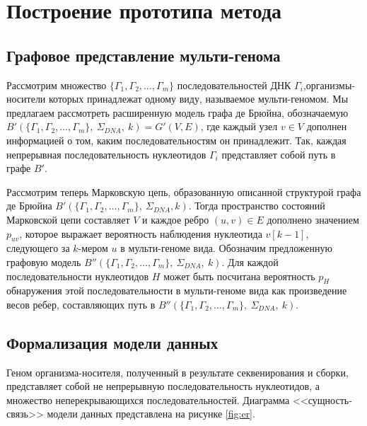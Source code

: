 \section{Построение прототипа метода}

\subsection{Графовое представление мульти-генома}
Рассмотрим множество $ \{\Gamma_1,\Gamma_2,\ldots,\Gamma_m\} $ последовательностей ДНК $ \Gamma_i $,\linebreak организмы-носители которых принадлежат одному виду, называемое мульти-геномом\cite{15_brandenburger2018multi,16_zekic2018pan}. Мы предлагаем рассмотреть расширенную модель графа де Брюйна, обозначаемую  $ B'\left(\{\Gamma_1,\Gamma_2,\ldots,\Gamma_m\},\ \Sigma_{DNA}, \ k\right)=G'\left(V,E\right) $, где каждый узел $ v \in V $ дополнен информацией о том, каким последовательностям он принадлежит. Так, каждая непрерывная последовательность нуклеотидов $ \Gamma_i $ представляет собой путь в графе $ B'$. 

Рассмотрим теперь Марковскую цепь, образованную\cite{17_heath2021computing} описанной структурой графа де Брюйна $ B'\left(\{\Gamma_1,\Gamma_2,\ldots,\Gamma_m\},\ \Sigma_{DNA}, k\right) $. Тогда пространство состояний Марковской цепи составляет $ V $ и каждое ребро $ \left(u,v\right) \in E $ дополнено значением $ p_{uv} $, которое выражает вероятность наблюдения нуклеотида $ v\left[k-1\right] $, следующего за $k$-мером $ u $ в мульти-геноме вида. Обозначим предложенную графовую модель $ B''\left(\{\Gamma_1,\Gamma_2,\ldots,\Gamma_m\},\ \Sigma_{DNA},\ k\right) $. Для каждой последовательности нуклеотидов $ H $ может быть посчитана вероятность $ p_H $ обнаружения этой последовательности в мульти-геноме вида как произведение весов ребер, составляющих путь в $ B''\left(\{\Gamma_1,\Gamma_2,\ldots,\Gamma_m\},\ \Sigma_{DNA},\ k\right) $.

\subsection{Формализация модели данных}
Геном организма-носителя, полученный в результате секвенирования и сборки, представляет собой не непрерывную последовательность нуклеотидов, а множество неперекрывающихся последовательностей. Диаграмма <<сущность-связь>> модели данных представлена на рисунке \ref{fig:er}.

